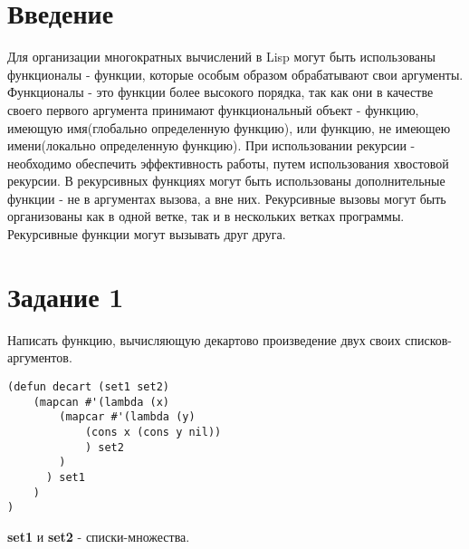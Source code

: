 \documentclass[a4paper, 12pt]{article}
\begin{document}
\section*{Введение}

\hspace*{5mm} Для организации многократных вычислений в Lisp могут быть использованы функционалы - функции, которые особым образом обрабатывают свои аргументы. Функционалы - это  функции более высокого порядка, так как они в качестве своего первого аргумента принимают функциональный объект - функцию, имеющую имя(глобально определенную функцию), или функцию, не имеющею имени(локально определенную функцию). При использовании рекурсии - необходимо обеспечить эффективность работы, путем использования хвостовой рекурсии. В рекурсивных функциях могут быть использованы дополнительные функции - не в аргументах вызова, а вне них. Рекурсивные вызовы могут быть организованы как в одной ветке, так и в нескольких ветках программы. Рекурсивные функции могут вызывать друг друга. 
\clearpage
\newpage




\lstset{style=mystyle}

\section*{Задание 1}
Написать функцию, вычисляющую декартово произведение двух своих списков-аргументов.

\begin{lstlisting}[caption=Функция вычисления декартова произведения]
(defun decart (set1 set2)
	(mapcan #'(lambda (x)
		(mapcar #'(lambda (y) 
			(cons x (cons y nil))
			) set2
		)
	  ) set1
	)
)
\end{lstlisting}
\textbf{set1} и \textbf{set2} - списки-множества.
\end{document}
